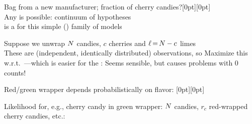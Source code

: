\documentclass{article}
\begin{document}
\begin{huge}

Bag from a new manufacturer; fraction \mat{$\theta$} of cherry candies?\hfill\epsfxsize=1.25in\raisebox{-1.25in}[0pt][0pt]{} \\
Any \mat{$\theta$} is possible: continuum of hypotheses \\
\mat{$\theta$} is a  for this simple () family of models 

Suppose we unwrap \(N\) candies, \(c\) cherries and \(\ell{\,{=}\,} N-c\) limes\\
These are  (independent, identically distributed) observations, so
\mat{\[
  P(\data |h_{\theta}) = \prod_{j\eq 1}^{\Ncount} P(\datum_j|h_{\theta}) =
  \theta^c\cdot (1-\theta)^{\ell}
\]}%
Maximize this w.r.t.~\mat{$\theta$}---which is easier for the :
%
Seems sensible, but causes problems with 0 counts!









Red/green wrapper depends probabilistically on flavor: \hspace*{0.75in}\epsfxsize=2.25in\raisebox{-2.5in}[0pt][0pt]{} 

Likelihood  for, e.g., cherry candy in green wrapper:
%
\(N\) candies, \(r_c\) red-wrapped cherry candies, etc.:
%
%


\end{huge}
\end{document}
